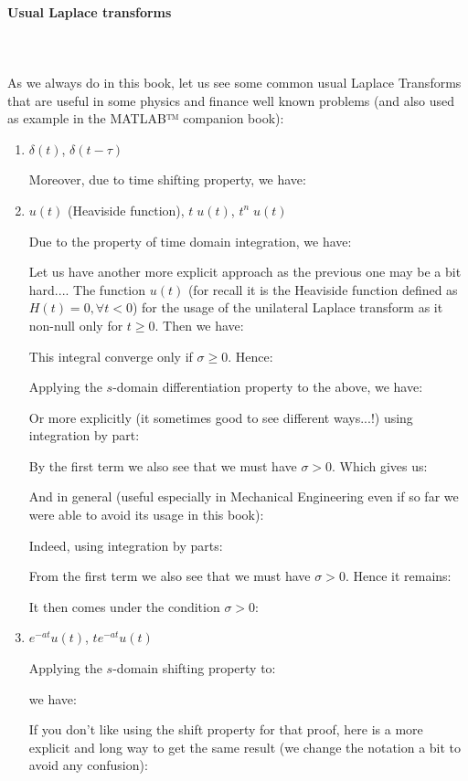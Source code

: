 	\paragraph{Usual Laplace transforms}\mbox{}\\\\
	As we always do in this book, let us see some common usual Laplace Transforms that are useful in some physics and finance well known problems (and also used as example in the MATLAB™ companion book):
	\begin{enumerate}
		\item $\delta(t)$, $\delta(t-\tau)$
		
		
		Moreover, due to time shifting property, we have:
		
		
		\item $u(t)$ (Heaviside function), $t\;u(t)$, $t^n\;u(t)$
		
		Due to the property of time domain integration, we have:
		
		Let us have another more explicit approach as the previous one may be a bit hard.... The function $u(t)$ (for recall it is the Heaviside function defined as $H(t)=0,\forall t<0$) for the usage of the unilateral Laplace transform as it non-null only for $t\geq 0$. Then we have:
		
		This integral converge only if $\sigma \geq 0$. Hence:
		
		Applying the $s$-domain differentiation property to the above, we have:
		
		Or more explicitly (it sometimes good to see different ways...!) using integration by part:
		
		By the first term we also see that we must have $\sigma>0$. Which gives us:
		
		And in general (useful especially in Mechanical Engineering even if so far we were able to avoid its usage in this book):
		
		Indeed, using integration by parts:
		
		From the first term we also see that we must have $\sigma >0$. Hence it remains:
		
		It then comes under the condition $\sigma>0$:
		
		
		\item $e^{-at}u(t)$, $te^{-at}u(t)$
		
		Applying the $s$-domain shifting property to:
		
		we have:
		
		If you don't like using the shift property for that proof, here is a more explicit and long way to get the same result (we change the notation a bit to avoid any confusion):
		

\end{enumerate}
